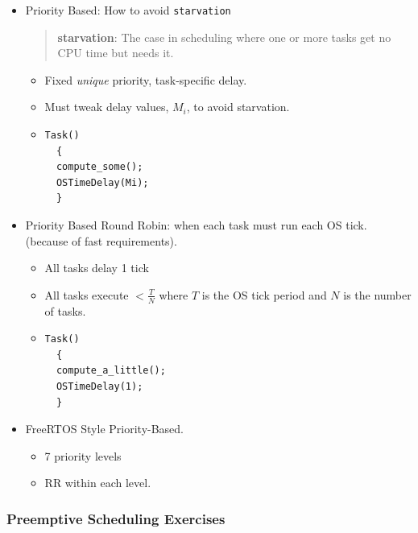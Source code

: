 \documentclass{article}	%
\begin{document}
\begin{itemize}
Assumption:  All tasks pre-emptable 100\% of the time.

        \item 	%
Priority Based: How to avoid {\tt starvation}

\begin{quotation}
{\bf starvation}: The case in scheduling where one or more tasks get no CPU time but needs it.
\end{quotation}

        \begin{itemize}
                \item Fixed {\it unique} priority, task-specific delay.
                \item Must tweak delay values, $M_i$,  to avoid
starvation.                \item \begin{verbatim}
Task()
  {
  compute_some();
  OSTimeDelay(Mi);
  }
\end{verbatim}
        \end{itemize}


       \item	%
 Priority Based Round Robin: when each task must run each OS tick.  (because of fast requirements).
        \begin{itemize}
                \item All tasks delay 1 tick
                \item All tasks execute $< \frac{T}{N}$ where $T$ is the
                OS tick period and $N$ is the number of tasks.
                \item  \begin{verbatim}
Task()
  {
  compute_a_little();
  OSTimeDelay(1);
  }
\end{verbatim}
        \end{itemize}

 \item	%
FreeRTOS Style Priority-Based. 
             \begin{itemize}
                \item 7 priority levels
		\item RR within each level.
              \end{itemize}

\end{itemize}	%


\subsubsection*{Preemptive Scheduling Exercises}
\end{document}

